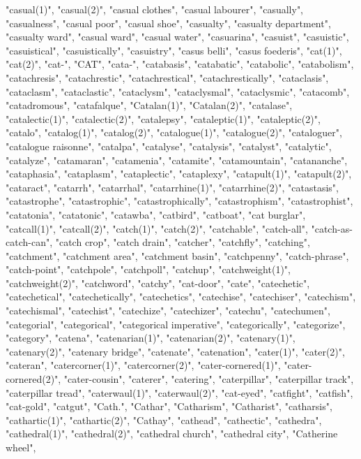 "casual(1)",
"casual(2)",
"casual clothes",
"casual labourer",
"casually",
"casualness",
"casual poor",
"casual shoe",
"casualty",
"casualty department",
"casualty ward",
"casual ward",
"casual water",
"casuarina",
"casuist",
"casuistic",
"casuistical",
"casuistically",
"casuistry",
"casus belli",
"casus foederis",
"cat(1)",
"cat(2)",
"cat-",
"CAT",
"cata-",
"catabasis",
"catabatic",
"catabolic",
"catabolism",
"catachresis",
"catachrestic",
"catachrestical",
"catachrestically",
"cataclasis",
"cataclasm",
"cataclastic",
"cataclysm",
"cataclysmal",
"cataclysmic",
"catacomb",
"catadromous",
"catafalque",
"Catalan(1)",
"Catalan(2)",
"catalase",
"catalectic(1)",
"catalectic(2)",
"catalepsy",
"cataleptic(1)",
"cataleptic(2)",
"catalo",
"catalog(1)",
"catalog(2)",
"catalogue(1)",
"catalogue(2)",
"cataloguer",
"catalogue raisonne",
"catalpa",
"catalyse",
"catalysis",
"catalyst",
"catalytic",
"catalyze",
"catamaran",
"catamenia",
"catamite",
"catamountain",
"catananche",
"cataphasia",
"cataplasm",
"cataplectic",
"cataplexy",
"catapult(1)",
"catapult(2)",
"cataract",
"catarrh",
"catarrhal",
"catarrhine(1)",
"catarrhine(2)",
"catastasis",
"catastrophe",
"catastrophic",
"catastrophically",
"catastrophism",
"catastrophist",
"catatonia",
"catatonic",
"catawba",
"catbird",
"catboat",
"cat burglar",
"catcall(1)",
"catcall(2)",
"catch(1)",
"catch(2)",
"catchable",
"catch-all",
"catch-as-catch-can",
"catch crop",
"catch drain",
"catcher",
"catchfly",
"catching",
"catchment",
"catchment area",
"catchment basin",
"catchpenny",
"catch-phrase",
"catch-point",
"catchpole",
"catchpoll",
"catchup",
"catchweight(1)",
"catchweight(2)",
"catchword",
"catchy",
"cat-door",
"cate",
"catechetic",
"catechetical",
"catechetically",
"catechetics",
"catechise",
"catechiser",
"catechism",
"catechismal",
"catechist",
"catechize",
"catechizer",
"catechu",
"catechumen",
"categorial",
"categorical",
"categorical imperative",
"categorically",
"categorize",
"category",
"catena",
"catenarian(1)",
"catenarian(2)",
"catenary(1)",
"catenary(2)",
"catenary bridge",
"catenate",
"catenation",
"cater(1)",
"cater(2)",
"cateran",
"catercorner(1)",
"catercorner(2)",
"cater-cornered(1)",
"cater-cornered(2)",
"cater-cousin",
"caterer",
"catering",
"caterpillar",
"caterpillar track",
"caterpillar tread",
"caterwaul(1)",
"caterwaul(2)",
"cat-eyed",
"catfight",
"catfish",
"cat-gold",
"catgut",
"Cath.",
"Cathar",
"Catharism",
"Catharist",
"catharsis",
"cathartic(1)",
"cathartic(2)",
"Cathay",
"cathead",
"cathectic",
"cathedra",
"cathedral(1)",
"cathedral(2)",
"cathedral church",
"cathedral city",
"Catherine wheel",
